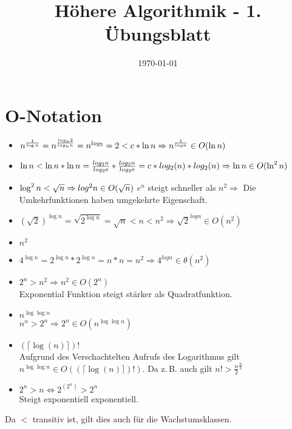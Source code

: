 \documentclass[a4paper,10pt]{scrartcl}
\title{H\"ohere Algorithmik - 1. \"Ubungsblatt}
\author{\Authors}
\date{\today}
\begin{document}
\maketitle

\section{$\boldsymbol{O}$-Notation}
\begin{itemize}
      \item $n^{\frac{1}{\log n}} = n^{\frac{log_n 2}{log_n n}} \\
	= n^{log_ 2} = 2 < c * \ln n \Rightarrow n^{\frac{1}{log n}} \in O(\ln n)$
      \item $\ln n < \ln n * \ln n = \frac{log_2 n}{log_2 \mathrm{e}} * \frac{log_2 n}{log_2 \mathrm{e}} = c * log_2 (n) * log_2 (n) \\
	\Rightarrow \ln n \in O(\ln^2 n)$
      \item $\log^2 n < \sqrt{n} \Rightarrow log^2 n \in O(\sqrt{n})\\ $
	$e^{n}$ steigt schneller als $n^2 \Rightarrow$ Die Umkehrfunktionen haben umgekehrte Eigenschaft.
      \item $(\sqrt{2})^{\log n} = \sqrt{2^{\log n}} = \sqrt{n} < n < n^2 \Rightarrow \sqrt{2}^{log n} \in O(n^2)$\\
      \item $n^2$
       \item $4^{\log n} = 2^{\log n} * 2^{\log n} = n * n = n^2 \Rightarrow 4^{log n} \in \theta(n^2)$\\
	
	\item $2^n > n^2 \Rightarrow n^2 \in O(2^n)$\\
		Exponential Funktion steigt stärker als Quadratfunktion.
	\item $n^{\log \log n}$\\
	    $n^n > 2^n \Rightarrow 2^n \in O(n^{\log \log n})$
	\item $(\lceil \log (n) \rceil )!$\\
		Aufgrund des Verschachtelten Aufrufs des Logarithmus gilt $n^{\log \log n} \in O((\lceil \log (n) \rceil )!)$.
		Da z.\,B. auch gilt $n! > \frac{n}{2}^{\frac{n}{2}}$
	\item $2^n > n \Leftrightarrow 2^{(2^n)} > 2^n$\\
		Steigt exponentiell exponentiell.
	
	
\end{itemize}
Da $<$ transitiv ist, gilt dies auch für die Wachstumsklassen.
\end{document}
